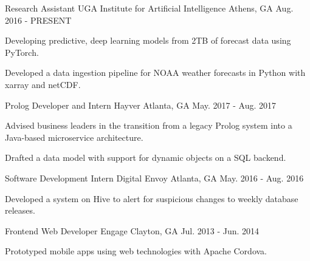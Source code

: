 \begin{cventries}

\cventry
{Research Assistant}
{UGA Institute for Artificial Intelligence}
{Athens, GA}
{Aug. 2016 - PRESENT}
{\begin{cvitems}
    \item {Developing predictive, deep learning models from 2TB of forecast data using PyTorch.}
    \item {Developed a data ingestion pipeline for NOAA weather forecasts in Python with xarray and netCDF.}
\end{cvitems}}

\cventry
{Prolog Developer and Intern}
{Hayver}
{Atlanta, GA}
{May. 2017 - Aug. 2017}
{\begin{cvitems}
    \item {Advised business leaders in the transition from a legacy Prolog system into a Java-based microservice architecture.}
    \item {Drafted a data model with support for dynamic objects on a SQL backend.}
\end{cvitems}}

\cventry
{Software Development Intern}
{Digital Envoy}
{Atlanta, GA}
{May. 2016 - Aug. 2016}
{\begin{cvitems}
    \item {Developed a system on Hive to alert for suspicious changes to weekly database releases.}
\end{cvitems}}

\cventry
{Frontend Web Developer}
{Engage}
{Clayton, GA}
{Jul. 2013 - Jun. 2014}
{{\begin{cvitems}
    \item {Prototyped mobile apps using web technologies with Apache Cordova.}
\end{cvitems}}}

\end{cventries}
